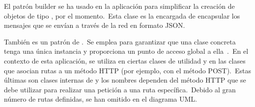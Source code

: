El patrón builder se ha usado en la aplicación para simplificar la creación de objetos de tipo
, por el
momento.\ Esta clase es la encargada de encapsular los mensajes que se envían a través de la red en formato JSON\@.



También es un patrón de .\ Se emplea para garantizar que una clase concreta tenga una única
instancia y proporciona un punto de acceso global a ella~\cite{sarcar2018java}.\ En el contexto de esta aplicación,
se utiliza en ciertas clases de utilidad y en las clases que asocian rutas a un método HTTP (por ejemplo,
 con el método POST).\ Estas últimas son clases internas de  y los nombres
dependen del método HTTP que se debe utilizar para realizar una petición a una ruta específica.\ Debido al gran
número de rutas definidas, se han omitido en el diagrama UML\@.

